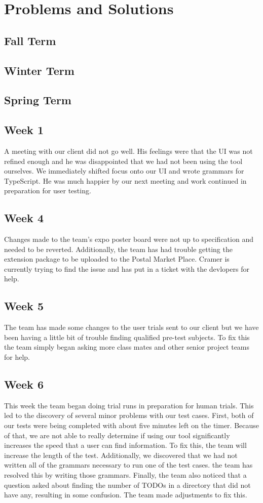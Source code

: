 \documentclass[letterpaper,10pt,titlepage,draftclsnofoot,onecolumn,onesided] {IEEEtran}
\begin{document}
\section{Problems and Solutions}
	\subsection{Fall Term}
	
	
	\subsection{Winter Term}
	
	
	\subsection{Spring Term}
	\subsection{Week 1}
	A meeting with our client did not go well. 
	His feelings were that the UI was not refined enough and he was disappointed that we had not been using the tool ourselves.
	We immediately shifted focus onto our UI and wrote grammars for TypeScript.
	He was much happier by our next meeting and work continued in preparation for user testing.
	\subsection{Week 4}
	Changes made to the team's expo poster board were not up to specification and needed to be reverted.
	Additionally, the team has had trouble getting the extension package to be uploaded to the Postal Market Place.
	Cramer is currently trying to find the issue and has put in a ticket with the devlopers for help.
	\subsection{Week 5}
	The team has made some changes to the user trials sent to our client but we have been having a little bit of trouble finding qualified pre-test subjects.
	To fix this the team simply began asking more class mates and other senior project teams for help.
	\subsection{Week 6}
	This week the team began doing trial runs in preparation for human trials.
	This led to the discovery of several minor problems with our test cases.
	First, both of our tests were being completed with about five minutes left on the timer.
	Because of that, we are not able to really determine if using our tool significantly increases the speed that a user can find information.
	To fix this, the team will increase the length of the test.
	Additionally, we discovered that we had not written all of the grammars necessary to run one of the test cases. 
	the team has resolved this by writing those grammars.
	Finally, the team also noticed that a question asked about finding the number of TODOs in a directory that did not have any, resulting in some confusion.
	The team made adjustments to fix this.
	
\end{document}
